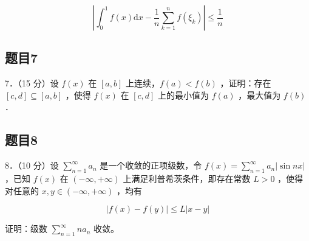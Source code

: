 \documentclass{article}
\begin{document}
\[
\left|\int_{0}^{1} f(x) \mathrm{d} x-\frac{1}{n} \sum_{k=1}^{n} f\left(\xi_{k}\right)\right| \leq \frac{1}{n}
\]

\subsection{题目7}
7．（15 分）设 \(f(x)\) 在 \([a, b]\) 上连续，\(f(a)<f(b)\) ，证明：存在 \([c, d] \subseteq[a, b]\) ，使得 \(f(x)\) 在 \([c, d]\) 上的最小值为 \(f(a)\) ，最大值为 \(f(b)\) ．

\subsection{题目8}
8．（10 分）设 \(\sum_{n=1}^{\infty} a_{n}\) 是一个收敛的正项级数，令 \(f(x)=\sum_{n=1}^{\infty} a_{n}|\sin n x|\) ，已知 \(f(x)\) 在 \((-\infty,+\infty)\) 上满足利普希茨条件，即存在常数 \(L>0\) ，使得对任意的 \(x, y \in(-\infty,+\infty)\) ，均有

\[
|f(x)-f(y)| \leq L|x-y|
\]

证明：级数 \(\sum_{n=1}^{\infty} n a_{n}\) 收敛。
\end{document}
